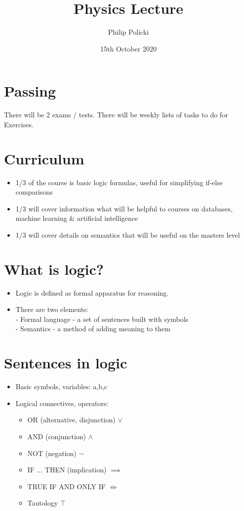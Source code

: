 \documentclass{article}
\title{Physics Lecture }
\author{Philip Policki}
\date{15th October 2020}
\begin{document}
\maketitle
\tableofcontents
\pagebreak
\section{Passing}
There will be 2 exams / tests.
There will be weekly lists of tasks to do for Exercises. 

\section{Curriculum}
\begin{itemize}
	\item 1/3 of the course is basic logic formulas, useful for simplifying if-else comparisons
	\item 1/3 will cover information what will be helpful to courses on databases, machine learning \& artificial intelligence
	\item 1/3 will cover details on semantics that will be useful on the masters level
\end{itemize}

\section{What is logic?}
\begin{itemize}
	\item Logic is defined as formal apparatus for reasoning.
	\item There are two elements: \\ - Formal language - a set of sentences built with symbols \\ - Semantics - a method of adding meaning to them
\end{itemize}

\section{Sentences in logic}
\begin{itemize}
	\item Basic symbols, variables: a,b,c
	\item Logical connectives, operators:
	\begin{itemize}
		\item OR (alternative, disjunction) $\lor$
		\item AND (conjunction) $\land$
		\item NOT (negation) $\lnot$
		\item IF ... THEN (implication) $\implies$
		\item TRUE IF AND ONLY IF $ \iff $
		\item Tautology $ \top $
	\end{itemize}
\end{itemize}
\end{document}
